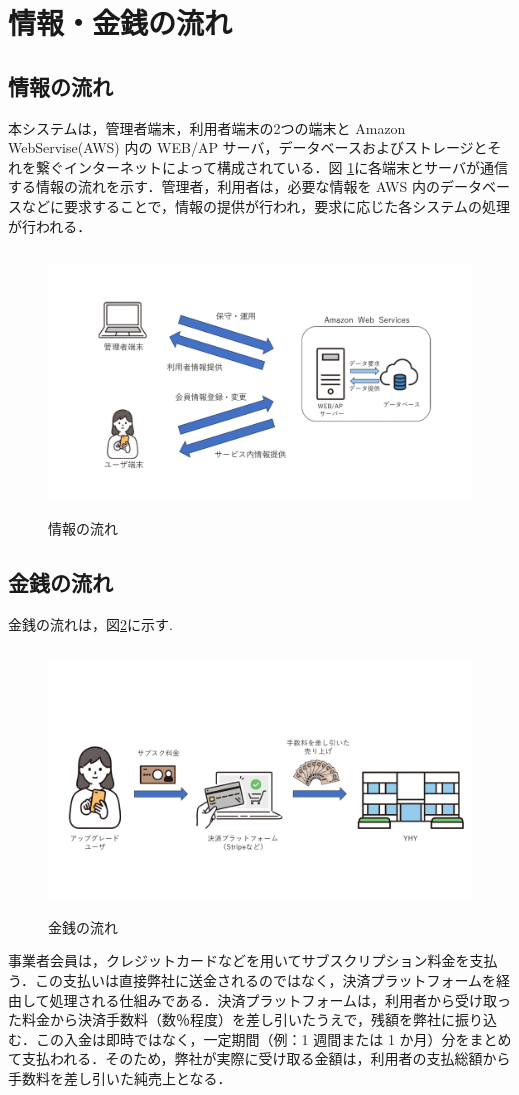 \section{情報・金銭の流れ}
\subsection{情報の流れ}
本システムは，管理者端末，利用者端末の2つの端末と Amazon WebServise(AWS) 内の WEB/AP サーバ，データベースおよびストレージとそれを繋ぐインターネットによって構成されている．図 \ref{fig:Q7}に各端末とサーバが通信する情報の流れを示す．管理者，利用者は，必要な情報を AWS 内のデータベースなどに要求することで，情報の提供が行われ，要求に応じた各システムの処理が行われる．

\begin{figure}[H]
        \centering
        \includegraphics[width=12cm, height=7cm]{sections/pictures/4-1_info.jpg}
        \caption{情報の流れ}
        \label{fig:Q7}
\end{figure}



\subsection{金銭の流れ}
金銭の流れは，図\ref{fig:Q8}に示す.

\begin{figure}[H]
        \centering
        \includegraphics[width=12cm, height=7cm]{sections/pictures/4-2_money.jpg}
        \caption{金銭の流れ}
        \label{fig:Q8}
\end{figure}

事業者会員は，クレジットカードなどを用いてサブスクリプション料金を支払う．この支払いは直接弊社に送金されるのではなく，決済プラットフォームを経由して処理される仕組みである．決済プラットフォームは，利用者から受け取った料金から決済手数料（数％程度）を差し引いたうえで，残額を弊社に振り込む．この入金は即時ではなく，一定期間（例：1 週間または 1 か月）分をまとめて支払われる．そのため，弊社が実際に受け取る金額は，利用者の支払総額から手数料を差し引いた純売上となる．







